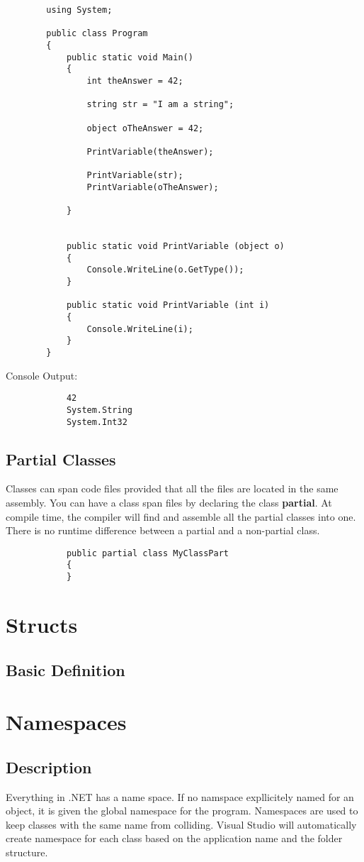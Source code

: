 \documentclass {amsart}
\begin{document}
		\begin{lstlisting}
		using System;
							
		public class Program
		{
			public static void Main()
			{
				int theAnswer = 42;

				string str = "I am a string";

				object oTheAnswer = 42;		

				PrintVariable(theAnswer);
				
				PrintVariable(str);
				PrintVariable(oTheAnswer);
				
			}
			
			
			public static void PrintVariable (object o)
			{
				Console.WriteLine(o.GetType());	
			}
			
			public static void PrintVariable (int i)
			{
				Console.WriteLine(i);	
			}	
		}
		\end{lstlisting}
		Console Output: 
		\begin{verbatim}
			42
			System.String
			System.Int32
		\end{verbatim}

	\subsection{Partial Classes}  Classes can span code files provided that all the files are located in the same assembly.  You can have a class span files by declaring the class {\bf partial}.  At compile time, the compiler will find and assemble all the partial classes into one.  There is no runtime difference between a partial and a non-partial class. 
		\begin{lstlisting}
			public partial class MyClassPart
			{
			}
		\end{lstlisting}
\section{Structs}
	\subsection{Basic Definition}
	

\section{Namespaces}
	\subsection{Description} Everything in .NET has a name space.  If no namspace expllicitely named for an object, it is given the global namespace for the program.  Namespaces are used to keep classes with the same name from colliding.  Visual Studio will automatically create namespace for each class based on the application name and the folder structure. 
\end{document}
